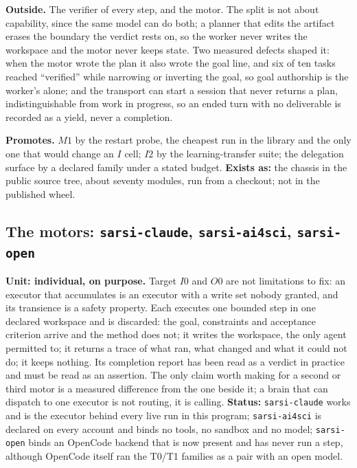 \documentclass[11pt]{article}
\theoremstyle{definition}
\begin{document}
\textbf{Outside.} The verifier of every step, and the motor. The split is not about capability, since the same model can do both; a planner that edits the artifact erases the boundary the verdict rests on, so the worker never writes the workspace and the motor never keeps state. Two measured defects shaped it: when the motor wrote the plan it also wrote the goal line, and six of ten tasks reached ``verified'' while narrowing or inverting the goal, so goal authorship is the worker's alone; and the transport can start a session that never returns a plan, indistinguishable from work in progress, so an ended turn with no deliverable is recorded as a yield, never a completion.

\textbf{Promotes.} $M1$ by the restart probe, the cheapest run in the library and the only one that would change an $I$ cell; $I2$ by the learning-transfer suite; the delegation surface by a declared family under a stated budget. \textbf{Exists as:} the chassis in the public source tree, about seventy modules, run from a checkout; not in the published wheel.

\subsection{The motors: \texttt{sarsi-claude}, \texttt{sarsi-ai4sci}, \texttt{sarsi-open}}

\textbf{Unit: individual, on purpose.} Target $I0$ and $O0$ are not limitations to fix: an executor that accumulates is an executor with a write set nobody granted, and its transience is a safety property. Each executes one bounded step in one declared workspace and is discarded: the goal, constraints and acceptance criterion arrive and the method does not; it writes the workspace, the only agent permitted to; it returns a trace of what ran, what changed and what it could not do; it keeps nothing. Its completion report has been read as a verdict in practice and must be read as an assertion. The only claim worth making for a second or third motor is a measured difference from the one beside it; a brain that can dispatch to one executor is not routing, it is calling. \textbf{Status:} \texttt{sarsi-claude} works and is the executor behind every live run in this program; \texttt{sarsi-ai4sci} is declared on every account and binds no tools, no sandbox and no model; \texttt{sarsi-open} binds an OpenCode backend that is now present and has never run a step, although OpenCode itself ran the T0/T1 families as a pair with an open model.
\end{document}
